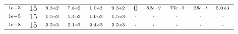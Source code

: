 \begin{tiny}
\begin{tabular}{@{$\;$}c@{$\;$}|@{$\;$}c@{$\;$}@{$\;$}c@{$\;$}@{$\;$}c@{$\;$}@{$\;$}c@{$\;$}@{$\;$}c@{$\;$}|@{$\;$}c@{$\;$}@{$\;$}c@{$\;$}@{$\;$}c@{$\;$}@{$\;$}c@{$\;$}@{$\;$}c@{$\;$}}
$\scriptstyle1\!\mathrm{\hspace{0.10em}e}-3$ & $\scriptstyle15$ & $\scriptstyle9.3\mathrm{\hspace{0.10em}e}2$ & $\scriptstyle7.8\mathrm{\hspace{0.10em}e}2$ & $\scriptstyle1.0\mathrm{\hspace{0.10em}e}3$ & $\scriptstyle9.3\mathrm{\hspace{0.10em}e}2$ & $\scriptstyle0$ & $\scriptstyle\textit{52}\hspace{0.00em}e\textit{--2}$ & $\scriptstyle\textit{77}\hspace{0.00em}e\textit{--3}$ & $\scriptstyle\textit{28}\hspace{0.00em}e\textit{--1}$ & $\scriptstyle5.0\mathrm{\hspace{0.10em}e}3$\\ 
$\scriptstyle1\!\mathrm{\hspace{0.10em}e}-5$ & $\scriptstyle15$ & $\scriptstyle1.5\mathrm{\hspace{0.10em}e}3$ & $\scriptstyle1.4\mathrm{\hspace{0.10em}e}3$ & $\scriptstyle1.6\mathrm{\hspace{0.10em}e}3$ & $\scriptstyle1.5\mathrm{\hspace{0.10em}e}3$ & $\scriptstyle.$ & $\scriptstyle.$ & $\scriptstyle.$ & $\scriptstyle.$ & $\scriptstyle.$\\ 
$\scriptstyle1\!\mathrm{\hspace{0.10em}e}-8$ & $\scriptstyle15$ & $\scriptstyle2.2\mathrm{\hspace{0.10em}e}3$ & $\scriptstyle2.1\mathrm{\hspace{0.10em}e}3$ & $\scriptstyle2.4\mathrm{\hspace{0.10em}e}3$ & $\scriptstyle2.2\mathrm{\hspace{0.10em}e}3$ & $\scriptstyle.$ & $\scriptstyle.$ & $\scriptstyle.$ & $\scriptstyle.$ & $\scriptstyle.$\\ 
\end{tabular} 
\end{tiny} 
